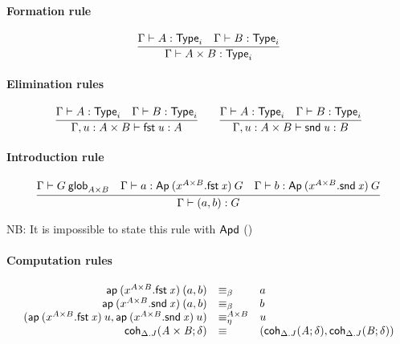 \paragraph{Formation rule}

\begin{small}
  \[
  \infer{\wftype\Gamma{A\times B}}
  {\wftype\Gamma{A}
    & \wftype\Gamma{B}}
  \]
\end{small}

\paragraph{Elimination rules}

\begin{small}
  \[
  \infer{\ofglob{\Gamma,u:A\times B}{\fst u}{A}}
  {\wftype\Gamma{A}
    & \wftype\Gamma{B}}
  \qquad
  \infer{\ofglob{\Gamma,u:A\times B}{\snd u}{B}}
  {\wftype\Gamma{A}
    & \wftype\Gamma{B}}
  \]
\end{small}

\paragraph{Introduction rule}

\begin{small}
  \[
  \infer{\ofglob{\Gamma}{(a, b)}{G}} {\wfglob{\Gamma}{G}{A\times B} &
    \ofglob{\Gamma}{a}{\Ap{(x^{A\times{}B}.\fst x)}{G}} &
    \ofglob{\Gamma}{b}{\Ap{(x^{A\times{}B}.\snd x)}{G}} }
  \]
\end{small}

NB: It is impossible to state this rule with $\mathsf{Apd}$ ()

\paragraph{Computation rules}

\begin{small}
  \[
  \begin{array}{rll}
    \mathsf{ap} \: {(x^{A\times{}B}.\mathit{\mathsf{fst} \: x})} \: {(a,b)} & \equiv_\beta & a\\
    \mathsf{ap} \: {(x^{A\times{}B}.\mathit{\mathsf{snd} \: x})} \: {(a,b)} & \equiv_\beta & b\\
    (\mathsf{ap} \: {(x^{A\times{}B}.\mathit{\mathsf{fst} \: x})} \: {u}, \mathsf{ap} \: {(x^{A\times{}B}.\mathit{\mathsf{snd} \: x})} \: {u}) & \equiv^{A\times{}B}_\eta & u\\
    \mathsf{coh}_{\Delta.J} \mathit{(A\times B;\delta)} & \equiv &
    (\mathsf{coh}_{\Delta.J} \mathit{(A;\delta)},\mathsf{coh}_{\Delta.J} \mathit{(B;\delta)})
  \end{array}
  \]
\end{small}

